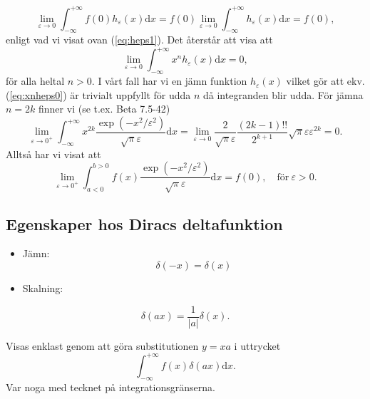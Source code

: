 \documentclass[%
oneside,                 %
final,                   %
10pt]{article}
\newenvironment{notice_mdfboxadmon}[1][]{
\begin{notice_mdfboxmdframed}[frametitle=#1]
}
{
\end{notice_mdfboxmdframed}
}
\newenvironment{warning_mdfboxadmon}[1][]{
\begin{warning_mdfboxmdframed}[frametitle=#1]
}
{
\end{warning_mdfboxmdframed}
}
\begin{document}
\begin{notice_mdfboxadmon}
\begin{equation}
\lim_{\varepsilon \to 0} \int_{-\infty}^{+\infty} f(0) h_\varepsilon(x) \mbox{d}x = f(0) \lim_{\varepsilon \to 0} \int_{-\infty}^{+\infty} h_\varepsilon(x) \mbox{d}x = f(0),
\end{equation}
enligt vad vi visat ovan (\ref{eq:heps1}). Det återstår att visa att 
\begin{equation}
\lim_{\varepsilon \to 0} \int_{-\infty}^{+\infty} x^n h_\varepsilon(x) \mbox{d}x = 0,
\label{eq:xnheps0}
\end{equation}
för alla heltal $n>0$. I vårt fall har vi en jämn funktion $h_\varepsilon(x)$ vilket gör att ekv. (\ref{eq:xnheps0}) är trivialt uppfyllt för udda $n$ då integranden blir udda. För jämna $n=2k$ finner vi (se t.ex. Beta 7.5-42) 
\begin{equation}
\lim_{\varepsilon \to 0^+}
\int_{-\infty}^{+\infty} x^{2k} \frac{\exp(-x^2 / \varepsilon^2)}{\sqrt{\pi} \varepsilon} \mbox{d}x = \lim_{\varepsilon \to 0} \frac{2}{\sqrt{\pi} \varepsilon} \frac{(2k-1)!!}{2^{k+1}} \sqrt{\pi} \varepsilon \varepsilon^{2k} = 0.
\end{equation}
Alltså har vi visat att
\begin{equation}
\lim_{\varepsilon \to 0^+}
\int_{a<0}^{b>0} f(x) \frac{\exp(-x^2 / \varepsilon^2)}{\sqrt{\pi} \varepsilon} \mbox{d}x = f(0), \quad \mathrm{för~} \varepsilon>0.
\end{equation}
\end{notice_mdfboxadmon} %



\subsection*{Egenskaper hos Diracs deltafunktion}

\begin{itemize}
\item Jämn: $$\delta(-x) = \delta(x)$$

\item Skalning: 
\end{itemize}

\noindent
$$
\delta(ax) = \frac{1}{|a|} \delta(x).
$$ 


\begin{warning_mdfboxadmon}[Kommentar]
Visas enklast genom att göra substitutionen $y=x a$ i uttrycket 
$$
\int_{-\infty}^{+\infty} f(x) \delta(ax) \mbox{d}x.
$$ 
Var noga med tecknet på integrationsgränserna.
\end{warning_mdfboxadmon} %
\end{document}
